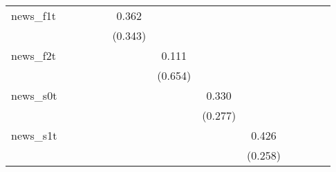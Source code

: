 {\begin{tabular}{l*{12}{c}}
\addlinespace
news\_f1t    &                     &                     &                     &                     &       0.362         &                     &                     &                     &                     &                     &                     &                     \\
            &                     &                     &                     &                     &     (0.343)         &                     &                     &                     &                     &                     &                     &                     \\
\addlinespace
news\_f2t    &                     &                     &                     &                     &                     &       0.111         &                     &                     &                     &                     &                     &                     \\
            &                     &                     &                     &                     &                     &     (0.654)         &                     &                     &                     &                     &                     &                     \\
\addlinespace
news\_s0t    &                     &                     &                     &                     &                     &                     &       0.330         &                     &                     &                     &                     &                     \\
            &                     &                     &                     &                     &                     &                     &     (0.277)         &                     &                     &                     &                     &                     \\
\addlinespace
news\_s1t    &                     &                     &                     &                     &                     &                     &                     &       0.426\sym{*}  &                     &                     &                     &                     \\
            &                     &                     &                     &                     &                     &                     &                     &     (0.258)         &                     &                     &                     &                     \\

\end{tabular}}
